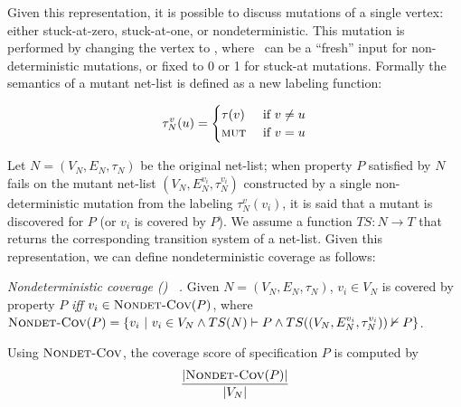 Given this representation, it is possible to discuss mutations of a single vertex: either stuck-at-zero, stuck-at-one, or nondeterministic.  This mutation is performed by changing the vertex to \mutnode, where \mutnode\ can be a ``fresh'' input for non-deterministic mutations, or fixed to 0 or 1 for stuck-at mutations. Formally the semantics of a mutant net-list is defined as a new labeling function:

\[ \tau^{v}_{N}(u) = \begin{cases}
    \tau(v) & \textrm{ if $v \neq u$} \\
    \textrm{{\sc mut}}   & \textrm{ if $v = u$}
\end{cases}  \]
\noindent


Let  $N = (V_N,E_N, \tau_N)$ be the original net-list;
when property $P$ satisfied by $N$ fails on the mutant net-list $(V_N, E^{v_i}_N, \tau^{v_i}_{N})$ constructed by a single non-deterministic mutation from the labeling $\tau^{v}_{N}(v_i)$, it is said that a mutant is discovered for $P$ (or $v_i$ is covered by $P$).
We assume a function $TS : N \rightarrow T$ that returns the corresponding transition system of a net-list. 
Given this representation, we can define nondeterministic coverage as follows:

\begin{definition} {\emph{Nondeterministic coverage (\nondetcov) ~\cite{chockler2010coverage}.} }
\label{def:non-det}
Given $N = (V_N,E_N, \tau_N)$,
$v_i \in V_N$ is covered by property $P$ \emph{iff} $v_i \in \text{\sc Nondet-Cov} (P)$, where
$\text{\sc Nondet-Cov} (P) = \{ v_i~|~ v_i \in V_N \wedge TS(N) \vdash P \wedge TS((V_N, E^{v_i}_N, \tau^{v_i}_{N})) \nvdash P \}$.
\end{definition}
Using  $\text{\sc Nondet-Cov}$, the coverage score of specification $P$ is computed by
\[
   \frac{ | \text{\sc Nondet-Cov} (P) |}{|V_N|}
\]


